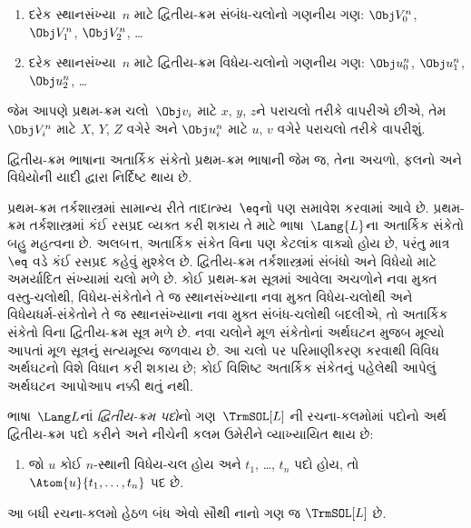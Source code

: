 \begin{enumerate}
\item દરેક સ્થાનસંખ્યા~$n$ માટે દ્વિતીય-ક્રમ સંબંધ-ચલોનો
  ગણનીય ગણ: $\Obj V_0^n$, $\Obj V_1^n$, $\Obj V_2^n$, \dots
\item દરેક સ્થાનસંખ્યા~$n$ માટે દ્વિતીય-ક્રમ વિધેય-ચલોનો
  ગણનીય ગણ:
  $\Obj u_0^n$, $\Obj u_1^n$, $\Obj u_2^n$, \dots
\end{enumerate}

જેમ આપણે પ્રથમ-ક્રમ ચલો~$\Obj v_i$ માટે $x$, $y$, $z$ને પરાચલો
તરીકે વાપરીએ છીએ, તેમ~$\Obj V_i^n$ માટે $X$, $Y$, $Z$ વગેરે અને
$\Obj u_i^n$ માટે $u$, $v$ વગેરે પરાચલો તરીકે વાપરીશું.

\begin{explain}
દ્વિતીય-ક્રમ ભાષાના અતાર્કિક સંકેતો પ્રથમ-ક્રમ ભાષાની જેમ જ, તેના
અચળો, ફલનો અને વિધેયોની યાદી દ્વારા
નિર્દિષ્ટ થાય છે.

પ્રથમ-ક્રમ તર્કશાસ્ત્રમાં સામાન્ય રીતે તાદાત્મ્ય~$\eq$નો પણ સમાવેશ
કરવામાં આવે છે. પ્રથમ-ક્રમ તર્કશાસ્ત્રમાં કંઈ રસપ્રદ વ્યક્ત કરી શકાય
તે માટે ભાષા~$\Lang{L}$ના અતાર્કિક સંકેતો બહુ મહત્વના છે. અલબત્ત,
અતાર્કિક સંકેત વિના પણ કેટલાંક વાક્યો હોય છે, પરંતુ માત્ર~$\eq$
વડે કંઈ રસપ્રદ કહેવું મુશ્કેલ છે. દ્વિતીય-ક્રમ તર્કશાસ્ત્રમાં સંબંધો
અને વિધેયો માટે અમર્યાદિત સંખ્યામાં ચલો મળે છે. કોઈ પ્રથમ-ક્રમ
સૂત્રમાં આવેલા અચળોને નવા મુક્ત વસ્તુ-ચલોથી, વિધેય-સંકેતોને તે જ
સ્થાનસંખ્યાના નવા મુક્ત વિધેય-ચલોથી અને વિધેયધર્મ-સંકેતોને તે જ
સ્થાનસંખ્યાના નવા મુક્ત સંબંધ-ચલોથી બદલીએ, તો અતાર્કિક સંકેતો વિના
દ્વિતીય-ક્રમ સૂત્ર મળે છે. નવા ચલોને મૂળ સંકેતોનાં અર્થઘટન મુજબ
મૂલ્યો આપતાં મૂળ સૂત્રનું સત્યમૂલ્ય જળવાય છે. આ ચલો પર પરિમાણીકરણ
કરવાથી વિવિધ અર્થઘટનો વિશે વિધાન કરી શકાય છે; કોઈ વિશિષ્ટ
અતાર્કિક સંકેતનું પહેલેથી આપેલું અર્થઘટન આપોઆપ નક્કી થતું નથી.
\end{explain}

\begin{defn}[દ્વિતીય-ક્રમ પદો]
ભાષા~$\Lang L$નાં \emph{દ્વિતીય-ક્રમ પદો}નો ગણ~$\TrmSOL[L]$
ની રચના-કલમોમાં પદોનો અર્થ
દ્વિતીય-ક્રમ પદો કરીને અને નીચેની કલમ ઉમેરીને વ્યાખ્યાયિત થાય છે:
\begin{enumerate}
\item જો $u$ કોઈ $n$-સ્થાની વિધેય-ચલ હોય અને $t_1$, \dots, $t_n$
  પદો હોય, તો $\Atom{u}{t_1, \ldots, t_n}$ પદ છે.
\end{enumerate}
આ બધી રચના-કલમો હેઠળ બંધ એવો સૌથી નાનો ગણ જ $\TrmSOL[L]$ છે.
\end{defn}

